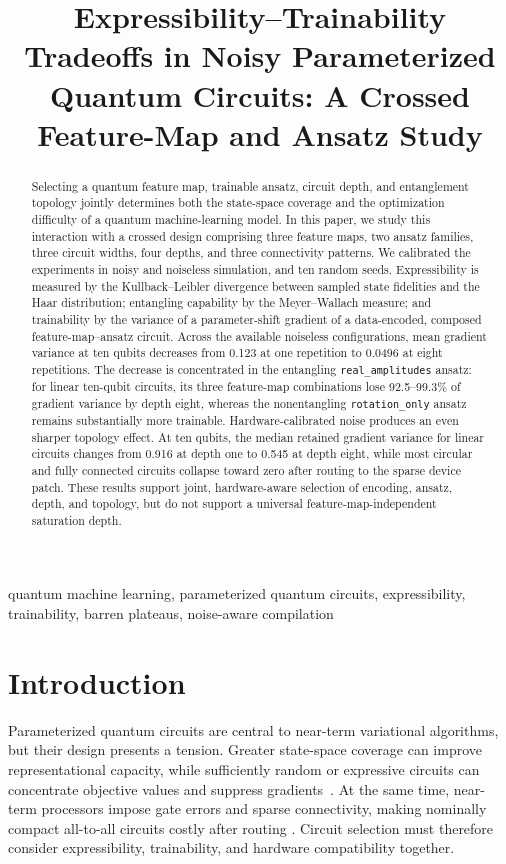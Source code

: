 \documentclass[conference]{IEEEtran}
\title{Expressibility--Trainability Tradeoffs in Noisy Parameterized
Quantum Circuits: A Crossed Feature-Map and Ansatz Study}
\author{\IEEEauthorblockN{Sounak Bhowmik}
\IEEEauthorblockA{Southern Methodist University, 
Dallas\\
sbhowmik@smu.edu}}
\begin{document}
\maketitle

\begin{abstract}
Selecting a quantum feature map, trainable ansatz, circuit depth, and
entanglement topology jointly determines both the state-space coverage and
the optimization difficulty of a quantum machine-learning model.  In this paper, we study
this interaction with a crossed design comprising three feature maps, two
ansatz families, three circuit widths, four depths, and three connectivity
patterns. We calibrated the experiments in noisy and noiseless simulation, and ten random seeds.
Expressibility is measured by the Kullback--Leibler divergence between
sampled state fidelities and the Haar distribution; entangling capability by
the Meyer--Wallach measure; and trainability by the variance of a
parameter-shift gradient of a data-encoded, composed feature-map--ansatz
circuit.  Across the available noiseless configurations, mean gradient
variance at ten qubits decreases from 0.123 at one repetition to 0.0496 at
eight repetitions.  The decrease is concentrated in the entangling
\texttt{real\_amplitudes} ansatz: for linear ten-qubit circuits, its three
feature-map combinations lose 92.5--99.3\% of gradient variance by depth
eight, whereas the nonentangling \texttt{rotation\_only} ansatz remains
substantially more trainable.  Hardware-calibrated noise produces an even
sharper topology effect.  At ten qubits, the median retained gradient
variance for linear circuits changes from 0.916 at depth one to 0.545 at
depth eight, while most circular and fully connected circuits collapse
toward zero after routing to the sparse device patch.  These results support
joint, hardware-aware selection of encoding, ansatz, depth, and topology,
but do not support a universal feature-map-independent saturation depth.
\end{abstract}

\begin{IEEEkeywords}
quantum machine learning, parameterized quantum circuits, expressibility,
trainability, barren plateaus, noise-aware compilation
\end{IEEEkeywords}

\section{Introduction}

Parameterized quantum circuits are central to near-term variational
algorithms, but their design presents a tension.  Greater state-space
coverage can improve representational capacity, while sufficiently random
or expressive circuits can concentrate objective values and suppress
gradients~\cite{mcclean2018barren,holmes2022connecting}.  At the same time,
near-term processors impose gate errors and sparse connectivity, making
nominally compact all-to-all circuits costly after routing
\cite{preskill2018nisq}.  Circuit selection must therefore consider
expressibility, trainability, and hardware compatibility together.
\end{document}
